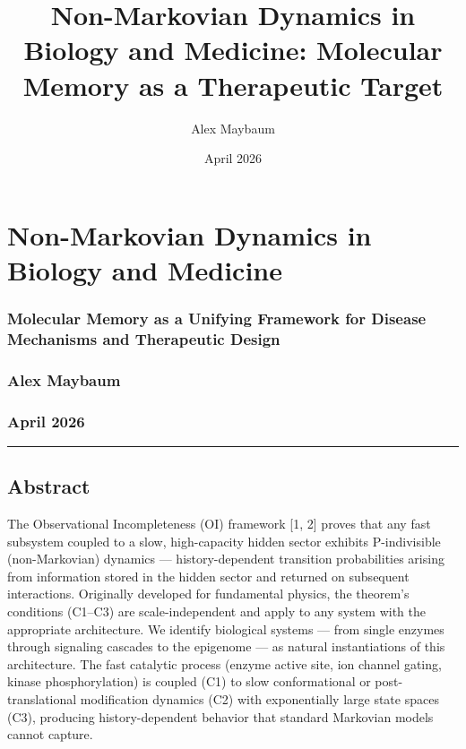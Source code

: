 \documentclass[
  11pt,
]{article}
\title{Non-Markovian Dynamics in Biology and Medicine: Molecular Memory as a Therapeutic Target}
\author{Alex Maybaum}
\date{April 2026}
\begin{document}
\maketitle

\hypertarget{non-markovian-dynamics-in-biology-and-medicine}{%
\section{Non-Markovian Dynamics in Biology and
Medicine}\label{non-markovian-dynamics-in-biology-and-medicine}}

\hypertarget{molecular-memory-as-a-unifying-framework-for-disease-mechanisms-and-therapeutic-design}{%
\subsubsection{Molecular Memory as a Unifying Framework for Disease
Mechanisms and Therapeutic
Design}\label{molecular-memory-as-a-unifying-framework-for-disease-mechanisms-and-therapeutic-design}}

\hypertarget{alex-maybaum}{%
\subsubsection{Alex Maybaum}\label{alex-maybaum}}

\hypertarget{april-2026}{%
\subsubsection{April 2026}\label{april-2026}}

\begin{center}\rule{0.5\linewidth}{0.5pt}\end{center}

\hypertarget{abstract}{%
\subsection{Abstract}\label{abstract}}

The Observational Incompleteness (OI) framework {[}1, 2{]} proves that
any fast subsystem coupled to a slow, high-capacity hidden sector
exhibits P-indivisible (non-Markovian) dynamics --- history-dependent
transition probabilities arising from information stored in the hidden
sector and returned on subsequent interactions. Originally developed for
fundamental physics, the theorem's conditions (C1--C3) are
scale-independent and apply to any system with the appropriate
architecture. We identify biological systems --- from single enzymes
through signaling cascades to the epigenome --- as natural
instantiations of this architecture. The fast catalytic process (enzyme
active site, ion channel gating, kinase phosphorylation) is coupled (C1)
to slow conformational or post-translational modification dynamics (C2)
with exponentially large state spaces (C3), producing history-dependent
behavior that standard Markovian models cannot capture.
\end{document}
